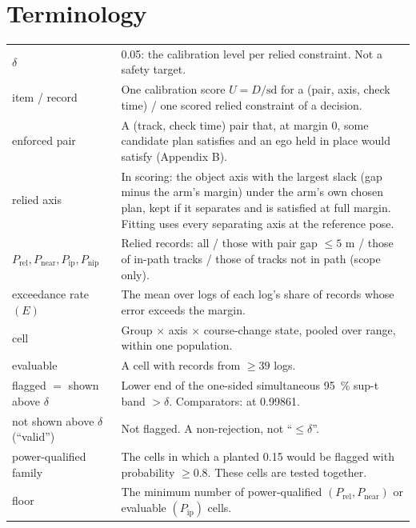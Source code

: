 \documentclass{ieeeaccess}
\begin{document}
\section{\break Terminology}
\begin{center}
\footnotesize
\setlength{\tabcolsep}{3pt}
\renewcommand{\arraystretch}{1.15}
\tabletail{\hline}
\tablelasttail{\hline}
\begin{supertabular}{@{}L{0.296\columnwidth}L{0.674\columnwidth}@{}}
$\delta$ & 0.05: the calibration level per relied constraint. Not a safety target. \\
item / record & One calibration score $U = D/\mathrm{sd}$ for a (pair, axis, check time) / one scored relied constraint of a decision. \\
enforced pair & A (track, check time) pair that, at margin 0, some candidate plan satisfies and an ego held in place would satisfy (Appendix B). \\
relied axis & In scoring: the object axis with the largest slack (gap minus the arm's margin) under the arm's own chosen plan, kept if it separates and is satisfied at full margin. Fitting uses every separating axis at the reference pose. \\
$P_{\mathrm{rel}}, P_{\mathrm{near}}, P_{\mathrm{ip}}, P_{\mathrm{nip}}$ & Relied records: all / those with pair gap $\leq 5$ m / those of in-path tracks / those of tracks not in path (scope only). \\
exceedance rate $(E)$ & The mean over logs of each log's share of records whose error exceeds the margin. \\
cell & Group $\times$ axis $\times$ course-change state, pooled over range, within one population. \\
evaluable & A cell with records from $\geq 39$ logs. \\
flagged $=$ shown above $\delta$ & Lower end of the one-sided simultaneous 95~\% sup-t band $> \delta$. Comparators: at 0.99861. \\
not shown above $\delta$ (``valid'') & Not flagged. A non-rejection, not ``$\leq \delta$''. \\
power-qualified family & The cells in which a planted 0.15 would be flagged with probability $\geq 0.8$. These cells are tested together. \\
floor & The minimum number of power-qualified $(P_{\mathrm{rel}}, P_{\mathrm{near}})$ or evaluable $(P_{\mathrm{ip}})$ cells. \\

\end{supertabular}
\end{center}
\end{document}
